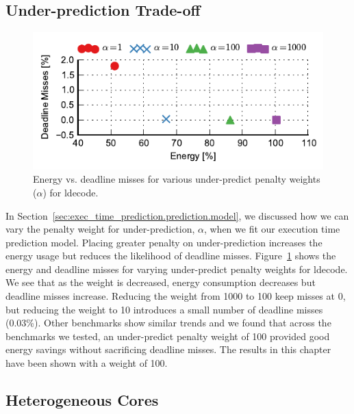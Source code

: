 \subsection{Under-prediction Trade-off}

\begin{figure}
  \begin{center}
    \includegraphics{exec_time_prediction/data/underpredict_sweep.pdf}
    \caption{Energy vs. deadline misses for various under-predict penalty
    weights ($\alpha$) for ldecode.}
    \label{fig:exec_time_prediction.evaluation.underpredict_sweep}
  \end{center}
\end{figure}

In Section~\ref{sec:exec_time_prediction.prediction.model}, we discussed how we
can vary the penalty weight for under-prediction, $\alpha$, when we fit our
execution time prediction model. Placing greater penalty on under-prediction
increases the energy usage but reduces the likelihood of deadline misses.
Figure~\ref{fig:exec_time_prediction.evaluation.underpredict_sweep} shows the
energy and deadline misses for varying under-predict penalty weights for
ldecode. We see that as the weight is decreased, energy consumption decreases
but deadline misses increase. Reducing the weight from 1000 to 100 keep misses
at 0, but reducing the weight to 10 introduces a small number of deadline
misses (0.03\%). Other benchmarks show similar trends and we found that across
the benchmarks we tested, an under-predict penalty weight of 100 provided good
energy savings without sacrificing deadline misses. The results in this chapter
have been shown with a weight of 100.

\subsection{Heterogeneous Cores}

